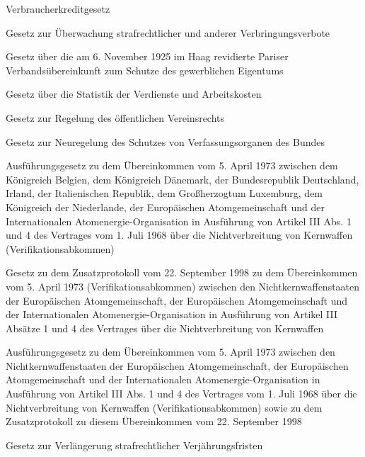 \item[{VerbrKrG}] Verbraucherkreditgesetz

\item[{VerbrVerbG}] Gesetz zur Überwachung strafrechtlicher und anderer Verbringungsverbote

\item[{VerbÜbkParisHaagG}] Gesetz über die am 6. November 1925 im Haag revidierte Pariser Verbandsübereinkunft zum Schutze des gewerblichen Eigentums

\item[{VerdStatG}] Gesetz über die Statistik der Verdienste und Arbeitskosten

\item[{VereinsG}] Gesetz zur Regelung des öffentlichen Vereinsrechts

\item[{VerfSchNRG}] Gesetz zur Neuregelung des Schutzes von Verfassungsorganen des Bundes

\item[{VerifAbkAusfG}] Ausführungsgesetz zu dem Übereinkommen vom 5. April 1973 zwischen dem Königreich Belgien, dem Königreich Dänemark, der Bundesrepublik Deutschland, Irland, der Italienischen Republik, dem Großherzogtum Luxemburg, dem Königreich der Niederlande, der Europäischen Atomgemeinschaft und der Internationalen Atomenergie-Organisation in Ausführung von Artikel III Abs. 1 und 4 des Vertrages vom 1. Juli 1968 über die Nichtverbreitung von Kernwaffen (Verifikationsabkommen)

\item[{VerifAbkZProtG}] Gesetz zu dem Zusatzprotokoll vom 22. September 1998 zu dem Übereinkommen vom 5. April 1973 (Verifikationsabkommen) zwischen den Nichtkernwaffenstaaten der Europäischen Atomgemeinschaft, der Europäischen Atomgemeinschaft und der Internationalen Atomenergie-Organisation in Ausführung von Artikel III Absätze 1 und 4 des Vertrages über die Nichtverbreitung von Kernwaffen

\item[{VerifZusAusfG}] Ausführungsgesetz zu dem Übereinkommen vom 5. April 1973 zwischen den Nichtkernwaffenstaaten der Europäischen Atomgemeinschaft, der Europäischen Atomgemeinschaft und der Internationalen Atomenergie-Organisation in Ausführung von Artikel III Abs. 1 und 4 des Vertrages vom 1. Juli 1968 über die Nichtverbreitung von Kernwaffen (Verifikationsabkommen) sowie zu dem Zusatzprotokoll zu diesem Übereinkommen vom 22. September 1998

\item[{VerjG-2}] Gesetz zur Verlängerung strafrechtlicher Verjährungsfristen


